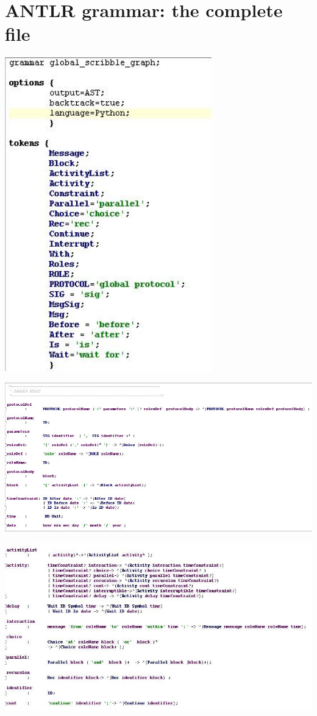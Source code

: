 \documentclass[a4paper,11pt,twoside]{report}
\begin{document}
\section{ANTLR grammar: the complete file}
\includegraphics[width=9cm]{grammar}

\includegraphics[width=18cm]{parser1}

\includegraphics[width=18cm]{parser2}
\end{document}

